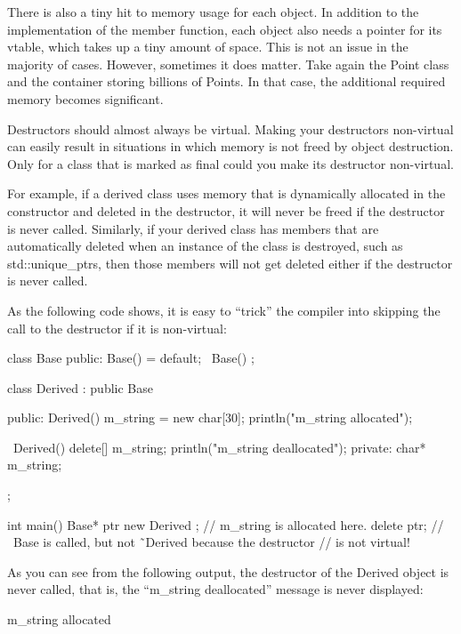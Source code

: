 There is also a tiny hit to memory usage for each object. In addition to the implementation of the member function, each object also needs a pointer for its vtable, which takes up a tiny amount of space. This is not an issue in the majority of cases. However, sometimes it does matter. Take again the Point class and the container storing billions of Points. In that case, the additional required memory becomes significant.


Destructors should almost always be virtual. Making your destructors non-virtual can easily result in situations in which memory is not freed by object destruction. Only for a class that is marked as final could you make its destructor non-virtual.

For example, if a derived class uses memory that is dynamically allocated in the constructor and deleted in the destructor, it will never be freed if the destructor is never called. Similarly, if your derived class has members that are automatically deleted when an instance of the class is destroyed, such as std::unique\_ptrs, then those members will not get deleted either if the destructor is never called.

As the following code shows, it is easy to “trick” the compiler into skipping the call to the destructor if it is non-virtual:

\begin{cpp}
class Base
{
    public:
        Base() = default;
        ~Base() {}
};

class Derived : public Base
{
    public:
        Derived()
        {
            m_string = new char[30];
            println("m_string allocated");
        }

        ~Derived()
        {
            delete[] m_string;
            println("m_string deallocated");
        }
    private:
        char* m_string;
};

int main()
{
    Base* ptr { new Derived {} }; // m_string is allocated here.
    delete ptr; // ~Base is called, but not ˜Derived because the destructor
                // is not virtual!
}
\end{cpp}

As you can see from the following output, the destructor of the Derived object is never called, that is, the “m\_string deallocated” message is never displayed:

\begin{cpp}
m_string allocated
\end{cpp}

